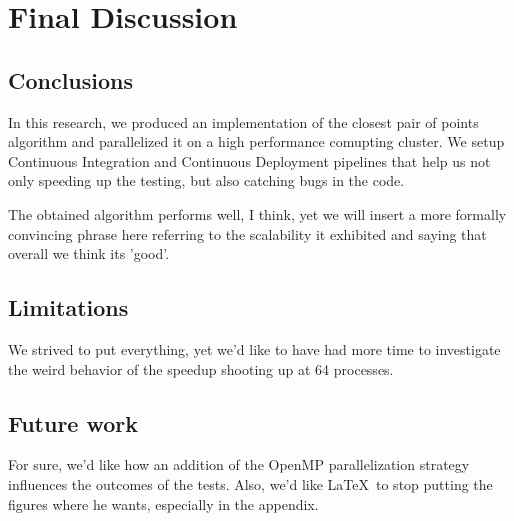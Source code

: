 \section{Final Discussion}
\label{sec:final_discussion}

\subsection{Conclusions}
In this research, we produced an implementation of the closest pair of points algorithm and parallelized it on a high performance comupting cluster.
We setup Continuous Integration and Continuous Deployment pipelines that help us not only speeding up the testing, but also catching bugs in the code.

The obtained algorithm performs well, I think, yet we will insert a more formally convincing phrase here referring to the scalability it exhibited and saying that overall we think its 'good'.

\subsection{Limitations}
We strived to put everything, yet we'd like to have had more time to investigate the weird behavior of the speedup shooting up at 64 processes.

\subsection{Future work}
For sure, we'd like how an addition of the OpenMP parallelization strategy influences the outcomes of the tests.
Also, we'd like \LaTeX~to stop putting the figures where he wants, especially in the appendix.
